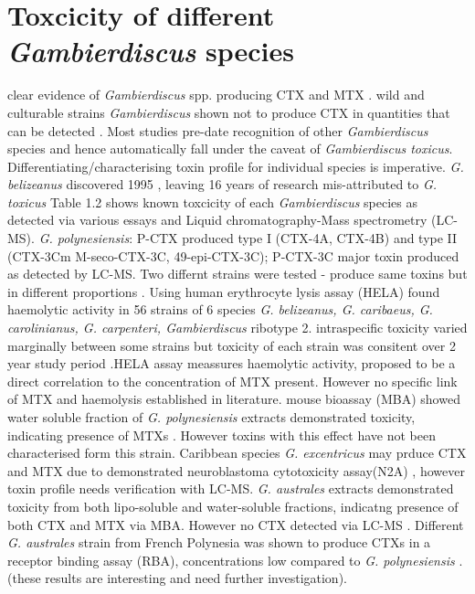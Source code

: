 \section{Toxcicity of different \emph{Gambierdiscus} species}
clear evidence of \emph{Gambierdiscus} spp. producing CTX and MTX \cite{murata1990structures,holmes1991strain,satake1993structure,holmes1994purification,satake1996isolation}.
wild and culturable strains \emph{Gambierdiscus} shown not to produce CTX in quantities that can be detected \cite{gillespie1985significance,holmes1990toxicity}.
Most studies pre-date recognition of other \emph{Gambierdiscus} species and hence automatically fall under the caveat of \emph{Gambierdiscus toxicus}. Differentiating/characterising toxin profile for individual species is imperative. \emph{G. belizeanus} discovered 1995 \cite{faust1995observation}, leaving 16 years of research mis-attributed to \emph{G. toxicus}
Table 1.2 shows known toxcicity of each \emph{Gambierdiscus} species as detected via various essays and Liquid chromatography-Mass spectrometry (LC-MS).
\emph{G. polynesiensis}: P-CTX produced type I (CTX-4A, CTX-4B) and type II (CTX-3Cm M-seco-CTX-3C, 49-epi-CTX-3C); P-CTX-3C major toxin produced as detected by LC-MS. Two differnt strains were tested - produce same toxins but in different proportions \cite{chinain2010growth}.
Using human erythrocyte lysis assay (HELA) found haemolytic activity in 56 strains of 6 species \emph{G. belizeanus, G. caribaeus, G. carolinianus, G. carpenteri, Gambierdiscus} ribotype 2. intraspecific toxicity varied marginally between some strains but toxicity of each strain was consitent over 2 year study period \cite{holland2013differences}.HELA assay meassures haemolytic activity, proposed to be a direct correlation to the concentration of MTX present. However no specific link of MTX and haemolysis established in literature. %
mouse bioassay (MBA) showed water soluble fraction of \emph{G. polynesiensis} extracts demonstrated toxicity, indicating presence of MTXs \cite{chinain1999morphology}. However toxins with this effect have not been characterised form this strain. %
Caribbean species \emph{G. excentricus} may prduce CTX and MTX due to demonstrated neuroblastoma cytotoxicity assay(N2A) \cite{fraga2011gambierdiscus}, however toxin profile needs verification with LC-MS.
\emph{G. australes} extracts demonstrated toxicity from both lipo-soluble and water-soluble fractions, indicatng presence of both CTX and MTX via MBA. However no CTX detected via LC-MS \cite{rhodes2010toxic}.
Different \emph{G. australes} strain from French Polynesia was shown to produce CTXs in a receptor binding assay (RBA), concentrations low compared to \emph{G. polynesiensis} \cite{chinain2010growth}. (these results are interesting and need further investigation).

